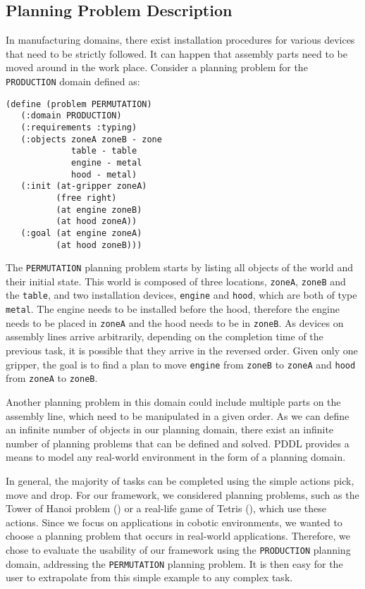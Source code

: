 \subsection{Planning Problem Description}\label{subsec:PPDescription}
In manufacturing domains, there exist installation procedures for various devices that need to be strictly followed. It can happen that assembly parts need to be moved around in the work place. Consider a planning problem for the \texttt{PRODUCTION} domain defined as:
\begin{verbatim}
(define (problem PERMUTATION)
   (:domain PRODUCTION)
   (:requirements :typing)
   (:objects zoneA zoneB - zone
             table - table
             engine - metal
             hood - metal)
   (:init (at-gripper zoneA)
          (free right)
          (at engine zoneB)
          (at hood zoneA))
   (:goal (at engine zoneA)
          (at hood zoneB)))
\end{verbatim}

The \texttt{PERMUTATION} planning problem starts by listing all objects of the world and their initial state. This world is composed of three locations, \texttt{zoneA}, \texttt{zoneB} and the \texttt{table}, and two installation devices, \texttt{engine} and \texttt{hood}, which are both of type \texttt{metal}. The engine needs to be installed before the hood, therefore the engine needs to be placed in \texttt{zoneA} and the hood needs to be in \texttt{zoneB}. As devices on assembly lines arrive arbitrarily, depending on the completion time of the previous task, it is possible that they arrive in the reversed order. Given only one gripper, the goal is to find a plan to move \texttt{engine} from \texttt{zoneB} to \texttt{zoneA} and \texttt{hood} from \texttt{zoneA} to \texttt{zoneB}. 

Another planning problem in this domain could include multiple parts on the assembly line, which need to be manipulated in a given order. 
As we can define an infinite number of objects in our planning domain, there exist an infinite number of planning problems that can be defined and solved. PDDL provides a means to model any real-world environment in the form of a planning domain. 

In general, the majority of tasks can be completed using the simple actions pick, move and drop. For our framework, we considered planning problems, such as the Tower of Hanoi problem (\cite{douglas1985metamagical}) or a real-life game of Tetris (\cite{tetris}), which use these actions. Since we focus on applications in cobotic environments, we wanted to choose a planning problem that occurs in real-world applications. Therefore, we chose to evaluate the usability of our framework using the \texttt{PRODUCTION} planning domain, addressing the \texttt{PERMUTATION} planning problem. It is then easy for the user to extrapolate from this simple example to any complex task.


